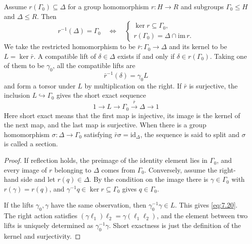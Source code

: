\begin{theorem}\label{thm:7.14}

Assume $r(\Gamma_0)\subseteq\Delta$ for a group homomorphism $r:H\to R$ and subgroups
$\Gamma_0\le H$ and $\Delta\le R$. Then
\begin{equation*}
r^{-1}(\Delta)=\Gamma_0
\quad\Longleftrightarrow\quad
\begin{cases}
\ker r\subseteq\Gamma_0,\\
r(\Gamma_0)=\Delta\cap\mathrm{im}\,r.
\end{cases}
\tag{7.19}\label{eq:7.19}
\end{equation*}
We take the restricted homomorphism to be $\bar r:\Gamma_0\to\Delta$ and its kernel to be
$L=\ker\bar r$.
A compatible lift of $\delta\in\Delta$ exists if and only if $\delta\in r(\Gamma_0)$.
Taking one of them to be $\gamma_0$, all the compatible lifts are
\begin{equation*}
\bar r^{-1}(\delta)=\gamma_0L
\tag{7.20}\label{eq:7.20}
\end{equation*}
and form a torsor under $L$ by multiplication on the right.
If $\bar r$ is surjective, the inclusion $L\hookrightarrow\Gamma_0$ gives the short exact
sequence
\begin{equation*}
1\longrightarrow L\longrightarrow\Gamma_0
\xrightarrow{\bar r}\Delta\longrightarrow1
\tag{7.21}\label{eq:7.21}
\end{equation*}
Here short exact means that the first map is injective, its image is the kernel of the next
map, and the last map is surjective.
When there is a group homomorphism $\sigma:\Delta\to\Gamma_0$ satisfying
$\bar r\sigma=\mathrm{id}_\Delta$, the sequence is said to split and $\sigma$ is called a
section.

\end{theorem}

\begin{proof}

If reflection holds, the preimage of the identity element lies in $\Gamma_0$, and every
image of $r$ belonging to $\Delta$ comes from $\Gamma_0$.
Conversely, assume the right-hand side and let $r(q)\in\Delta$.
By the condition on the image there is $\gamma\in\Gamma_0$ with $r(\gamma)=r(q)$, and
$\gamma^{-1}q\in\ker r\subseteq\Gamma_0$ gives $q\in\Gamma_0$.

If the lifts $\gamma_0,\gamma$ have the same observation, then $\gamma_0^{-1}\gamma\in L$.
This gives \eqref{eq:7.20}. The right action satisfies
$(\gamma\ell_1)\ell_2=\gamma(\ell_1\ell_2)$, and the element between two lifts is uniquely
determined as $\gamma_0^{-1}\gamma$.
Short exactness is just the definition of the kernel and surjectivity.

\end{proof}

